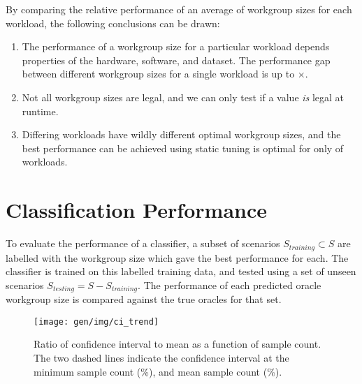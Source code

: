 By comparing the relative performance of an average of
 workgroup sizes for each workload, the
following conclusions can be drawn:

\begin{enumerate}
\item The performance of a workgroup size for a particular workload
  depends properties of the hardware, software, and dataset. The
  performance gap between different workgroup sizes for a single
  workload is up to $\times$.
\item Not all workgroup sizes are legal, and we can only test if a
  value \emph{is} legal at runtime.
\item Differing workloads have wildly different optimal workgroup
  sizes, and the best performance can be achieved using static tuning
  is optimal for only  of
  workloads.
\end{enumerate}



\section{Classification Performance}


To evaluate the performance of a classifier, a subset of scenarios
$S_{training} \subset S$ are labelled with the workgroup size which
gave the best performance for each. The classifier is trained on this
labelled training data, and tested using a set of unseen scenarios
$S_{testing} = S - S_{training}$. The performance of each predicted
oracle workgroup size is compared against the true oracles for that
set. %


\begin{figure}
\centering
\texttt{[image: gen/img/ci\_trend]}
\caption{%
  Ratio of confidence interval to mean as a function of sample
  count. The two dashed lines indicate the confidence interval at the
  minimum sample count (\%), and mean sample count
  (\%).%
}
\label{fig:ci-trends}
\end{figure}




